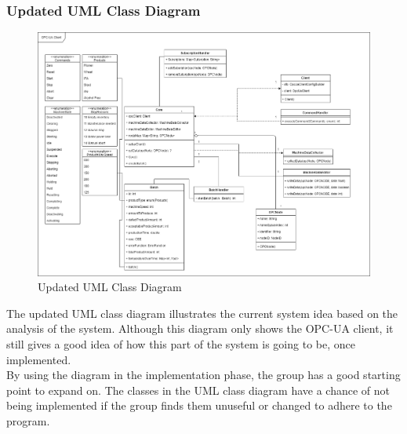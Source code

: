 \subsubsection{Updated UML Class Diagram}
\begin{figure}[ht]
\centering 
\includegraphics[scale=0.3]{images/diagrams/updated_UML_Class_Diagram.drawio.png}
\caption{Updated UML Class Diagram}
\label{figure:updated_UML_class_diagram} 
\end{figure}


The updated UML class diagram illustrates the current system idea based on the 
analysis of the system. Although this diagram only shows the 
OPC-UA client, it still gives a good idea of how this part of the system is going
to be, once implemented. \\

By using the diagram in the implementation phase, the group has a good starting 
point to expand on. The classes in the UML class diagram have a chance of not 
being implemented if the group finds them unuseful or changed to adhere to the 
program.